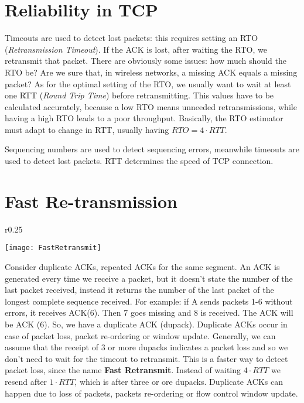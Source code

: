 \section{Reliability in TCP}
Timeouts are used to detect lost packets: this 
requires setting an RTO (\textit{Retransmission Timeout}). If the ACK is lost,
after waiting the RTO, we retransmit that packet. There are obviously some
issues: how much should the RTO be? Are we sure that, in wireless networks,
a missing ACK equals a missing packet?
As for the optimal setting of the RTO, we usually want to wait at least 
one RTT (\textit{Round Trip Time}) before retransmitting. This values have to be
calculated accurately, because a low RTO means unneeded retransmissions, while 
having a high RTO leads to a poor throughput. Basically, the RTO estimator must 
adapt to change in RTT, usually having $RTO=4 \cdot RTT$.

Sequencing numbers are used to detect sequencing errors, meanwhile timeouts
are used to detect lost packets.
RTT determines the speed of TCP connection.

\section{Fast Re-transmission}

\begin{wrapfigure}{r}{0.25\textwidth}
  \begin{center}
    \texttt{[image: FastRetransmit]}
  \end{center}
  \caption[Fast Retransmission example]{}
\end{wrapfigure}

Consider duplicate ACKs, repeated ACKs for the same segment. An ACK is generated
every time we receive a packet, but it doesn't
state the number of the last packet received, instead it returns the number of
the last packet of the longest complete sequence received.
For example: if A sends packets 1-6 without errors, it receives ACK(6). 
Then 7 goes missing and 8 is received. The ACK will be ACK (6). So, we have a 
duplicate ACK (dupack).
Duplicate ACKs occur in case of packet loss, packet re-ordering or 
window update. Generally, we can assume that the receipt of 3 or more dupacks 
indicates a packet loss and so we don't need to wait for the timeout to 
retransmit. This is a faster way to detect packet loss, since the name
\textbf{Fast Retransmit}.
Instead of waiting $4 \cdot RTT$ we resend after $1 \cdot RTT$, which is after
three or ore dupacks.
Duplicate ACKs can happen due to loss of packets, packets re-ordering or flow
control window update.

